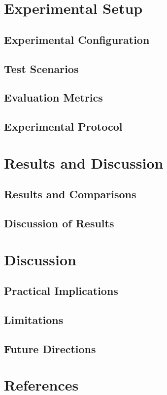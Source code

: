 \documentclass[conference]{IEEEtran}
\begin{document}
\section{Experimental Setup}
\label{sec:experiments}
\subsection{Experimental Configuration}
\subsection{Test Scenarios}
\subsection{Evaluation Metrics}
\subsection{Experimental Protocol}

\section{Results and Discussion}
\label{sec:results}
\subsection{Results and Comparisons}
\subsection{Discussion of Results}

\section{Discussion}
\label{sec:discussion}
\subsection{Practical Implications}
\subsection{Limitations}
\subsection{Future Directions}

\section*{References}

\nocite{alDhuraibi2017elasticDocker}

% 



\end{document}
